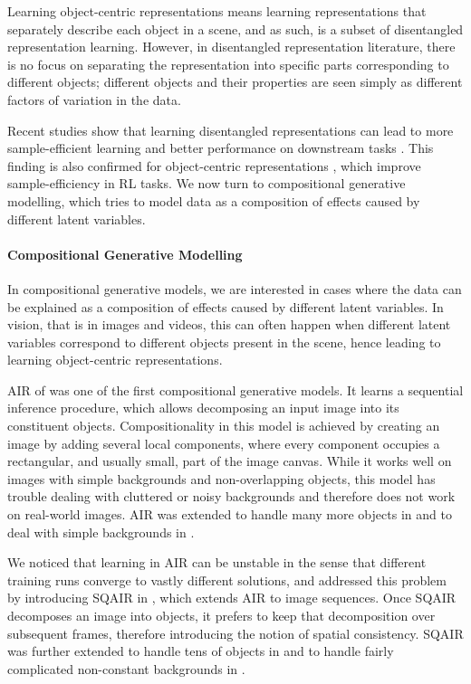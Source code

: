 Learning object-centric representations means learning representations that separately describe each object in a scene, and as such, is a subset of disentangled representation learning.
However, in disentangled representation literature, there is no focus on separating the representation into specific parts corresponding to different objects; different objects and their properties are seen simply as different factors of variation in the data. 

Recent studies show that learning disentangled representations can lead to more sample-efficient learning and better performance on downstream tasks \citep{Steenkiste2019disentangled}.
This finding is also confirmed for object-centric representations \citep{Veerapaneni2019op3}, which improve sample-efficiency in \gls{RL} tasks.
We now turn to compositional generative modelling, which tries to model data as a composition of effects caused by different latent variables.

\paragraph{Compositional Generative Modelling}
In compositional generative models, we are interested in cases where the data can be explained as a composition of effects caused by different latent variables.
In vision, that is in images and videos, this can often happen when different latent variables correspond to different objects present in the scene, hence leading to learning object-centric representations.

\Gls{AIR} of \cite{Eslami2016air} was one of the first compositional generative models.
It learns a sequential inference procedure, which allows decomposing an input image into its constituent objects.
Compositionality in this model is achieved by creating an image by adding several local components, where every component occupies a rectangular, and usually small, part of the image canvas.
While it works well on images with simple backgrounds and non-overlapping objects, this model has trouble dealing with cluttered or noisy backgrounds and therefore does not work on real-world images. \Gls{AIR} was extended to handle many more objects in \cite{Crawford2019spair} and to deal with simple backgrounds in \cite{Stelzner2019supair}.

We noticed that learning in \gls{AIR} can be unstable in the sense that different training runs converge to vastly different solutions, and addressed this problem by introducing \gls{SQAIR} in , which extends \gls{AIR} to image sequences.
Once \gls{SQAIR} decomposes an image into objects, it prefers to keep that decomposition over subsequent frames, therefore introducing the notion of spatial consistency.
\Gls{SQAIR} was further extended to handle tens of objects in \cite{Crawford2020silot,Jiang2019scalor} and to handle fairly complicated non-constant backgrounds in \cite{Jiang2019scalor}.

